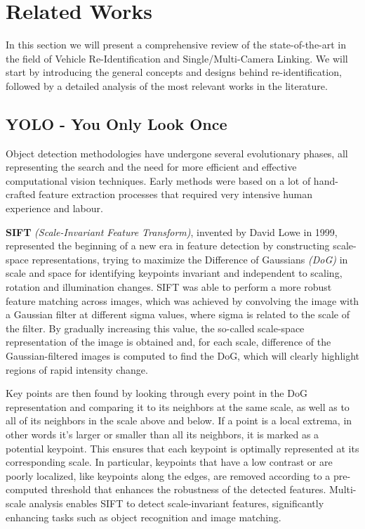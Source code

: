 \chapter{Related Works}
\label{chap:RelatedWorks}

In this section we will present a comprehensive review of the state-of-the-art in the field of Vehicle Re-Identification and Single/Multi-Camera Linking. We will start by introducing the general concepts and designs behind re-identification, followed by a detailed analysis of the most relevant works in the literature.

\section{YOLO - You Only Look Once}
Object detection methodologies have undergone several evolutionary phases, all representing the search and the need for more efficient and effective computational vision techniques. Early methods were based on a lot of hand-crafted feature extraction processes that required very intensive human experience and labour.

\textbf{SIFT} \textit{(Scale-Invariant Feature Transform)}, invented by David Lowe in 1999, represented the beginning of a new era in feature detection by constructing scale-space representations, trying to maximize the Difference of Gaussians \textit{(DoG)} in scale and space for identifying keypoints invariant and independent to scaling, rotation and illumination changes. SIFT was able to perform a more robust feature matching across images, which was achieved by convolving the image with a Gaussian filter at different sigma values, where sigma is related to the scale of the filter. By gradually increasing this value, the so-called scale-space representation of the image is obtained and, for each scale, difference of the Gaussian-filtered images is computed to find the DoG, which will clearly highlight regions of rapid intensity change. 

Key points are then found by looking through every point in the DoG representation and comparing it to its neighbors at the same scale, as well as to all of its neighbors in the scale above and below. If a point is a local extrema, in other words it's larger or smaller than all its neighbors, it is marked as a potential keypoint. This ensures that each keypoint is optimally represented at its corresponding scale. In particular, keypoints that have a low contrast or are poorly localized, like keypoints along the edges, are removed according to a pre-computed threshold that enhances the robustness of the detected features. Multi-scale analysis enables SIFT to detect scale-invariant features, significantly enhancing tasks such as object recognition and image matching.

